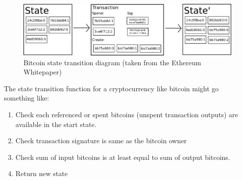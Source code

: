 \begin{figure}
\centering
\includegraphics[width=\textwidth]{Figures/state_transition}
\decoRule
\caption[]{Bitcoin state transition diagram (taken from the Ethereum Whitepaper\cite{Ethereum})}
\label{fig:bitcoin_transition}
\end{figure}

The state transition function for a cryptocurrency like bitcoin might go something like:
\begin{enumerate}
\item Check each referenced or spent bitcoins (unspent transaction outputs) are available in the start state.
\item Check transaction signature is same as the bitcoin owner
\item Check sum of input bitcoins is at least equal to sum of output bitcoins.
\item Return new state 
\end{enumerate}

